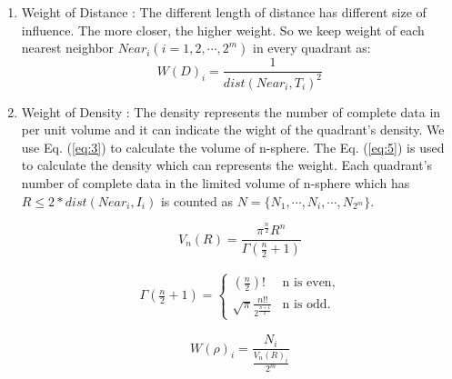 \documentclass[print]{jicspack}
\begin{document}
\begin{enumerate}[(1)]
\item Weight of Distance : The different length of distance has different size of influence. The more closer, the higher weight. So we keep weight of each nearest neighbor $Near_i (i=1, 2, \cdots, 2^m)$ in every quadrant as:
\begin{equation}
\label{eq:2}
W(D)_i = \frac{1}{dist(Near_i, T_i)^2}
\end{equation}
\item Weight of Density : The density represents the number of complete data in per unit volume and it can indicate the wight of the quadrant's density. We use Eq. (\ref{eq:3}) to calculate the volume of n-sphere. The Eq. (\ref{eq:5}) is used to calculate the density which can represents the weight. Each quadrant's number of complete data in the limited volume of n-sphere which has $R \leq 2 * dist(Near_i, I_i)$ is counted as $N = \{N_1, \cdots, N_i, \cdots, N_{2^m}\}$.

\begin{equation}
\label{eq:3}
V_n(R) = \frac{\pi^{\frac{n}{2}}R^n}{\Gamma (\frac{n}{2} + 1)}
\end{equation}

\begin{eqnarray}\label{eq:4}
\Gamma(\frac{n}{2} + 1) = \left\{\begin{array}{ll}(\frac{n}{2})! & \mbox{n is even} ,\\\sqrt{\pi}\frac{n!!}{2^{\frac{n+1}{2}}} & \mbox{n is odd}.\end{array}\right.
\end{eqnarray}

\begin{equation}
\label{eq:5}
W(\rho)_i = \frac{N_i}{\frac{V_n(R)_i}{2^m}}
\end{equation}


\end{enumerate}
\end{document}
